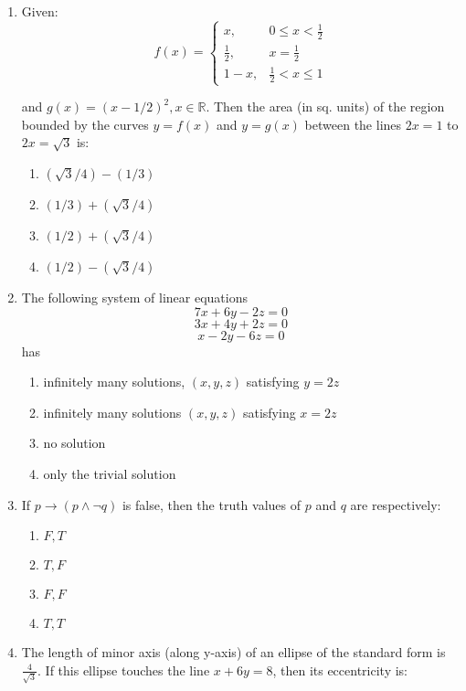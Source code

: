 \documentclass[journal]{IEEEtran}
\numberwithin{equation}{enumi}
\numberwithin{figure}{enumi}
\begin{document}
\begin{enumerate}
    \item Given:
        \[f(x)=\begin{cases}
        x, & 0 \leq x < \frac{1}{2} \\
        \frac{1}{2}, & x = \frac{1}{2} \\
        1-x, & \frac{1}{2} < x \leq 1
        \end{cases}\]
        
        and $g(x) = (x-1/2)^{2}, x \in \mathbb{R}$. Then the area (in sq. units) of the region bounded by the curves $y = f(x)$ and $y = g(x)$ between the lines $2x=1$ to $2x=\sqrt{3}$ is:
        
        \begin{enumerate}
        \item $(\sqrt{3}/4)-(1/3)$
        \item $(1/3)+(\sqrt{3}/4)$
        \item $(1/2)+(\sqrt{3}/4)$
        \item $(1/2)-(\sqrt{3}/4)$
        \end{enumerate}

    \item The following system of linear equations
        \[7x+6y-2z=0\] 
        \[3x+4y+2z=0\]
        \[x-2y-6z=0\]
        has
        \begin{enumerate}
        \item infinitely many solutions, $(x,y,z)$ satisfying $y=2z$
        \item infinitely many solutions $(x,y,z)$ satisfying $x=2z$
        \item no solution
        \item only the trivial solution
        \end{enumerate}

    \item If \( p \to (p \land \neg q) \) is false, then the truth values of \( p \) and \( q \) are respectively:
        \begin{multicols}{4}
        \begin{enumerate}
            \item \( F, T \)  
            \item \( T, F \)  
            \item \( F, F \)  
            \item \( T, T \)
        \end{enumerate}
        \end{multicols}

    \item The length of minor axis (along y-axis) of an ellipse of the standard form is $\frac{4}{\sqrt{3}}$. If this ellipse touches the line $x+6y=8$, then its eccentricity is:


\end{enumerate}
\end{document}
